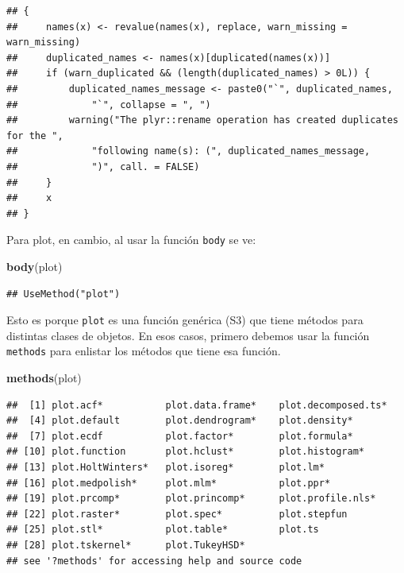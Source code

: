 \documentclass[]{article}
\newenvironment{Shaded}{\begin{snugshade}}{\end{snugshade}}
\newcommand{\KeywordTok}[1]{\textcolor[rgb]{0.13,0.29,0.53}{\textbf{{#1}}}}
\newcommand{\NormalTok}[1]{{#1}}
\begin{document}
\begin{verbatim}
## {
##     names(x) <- revalue(names(x), replace, warn_missing = warn_missing)
##     duplicated_names <- names(x)[duplicated(names(x))]
##     if (warn_duplicated && (length(duplicated_names) > 0L)) {
##         duplicated_names_message <- paste0("`", duplicated_names, 
##             "`", collapse = ", ")
##         warning("The plyr::rename operation has created duplicates for the ", 
##             "following name(s): (", duplicated_names_message, 
##             ")", call. = FALSE)
##     }
##     x
## }
\end{verbatim}

Para plot, en cambio, al usar la función \texttt{body} se ve:

\begin{Shaded}
\begin{Highlighting}[]
\KeywordTok{body}\NormalTok{(plot)}
\end{Highlighting}
\end{Shaded}

\begin{verbatim}
## UseMethod("plot")
\end{verbatim}

Esto es porque \texttt{plot} es una función genérica (S3) que tiene
métodos para distintas clases de objetos. En esos casos, primero debemos
usar la función \texttt{methods} para enlistar los métodos que tiene esa
función.

\begin{Shaded}
\begin{Highlighting}[]
\KeywordTok{methods}\NormalTok{(plot)}
\end{Highlighting}
\end{Shaded}

\begin{verbatim}
##  [1] plot.acf*           plot.data.frame*    plot.decomposed.ts*
##  [4] plot.default        plot.dendrogram*    plot.density*      
##  [7] plot.ecdf           plot.factor*        plot.formula*      
## [10] plot.function       plot.hclust*        plot.histogram*    
## [13] plot.HoltWinters*   plot.isoreg*        plot.lm*           
## [16] plot.medpolish*     plot.mlm*           plot.ppr*          
## [19] plot.prcomp*        plot.princomp*      plot.profile.nls*  
## [22] plot.raster*        plot.spec*          plot.stepfun       
## [25] plot.stl*           plot.table*         plot.ts            
## [28] plot.tskernel*      plot.TukeyHSD*     
## see '?methods' for accessing help and source code
\end{verbatim}
\end{document}
